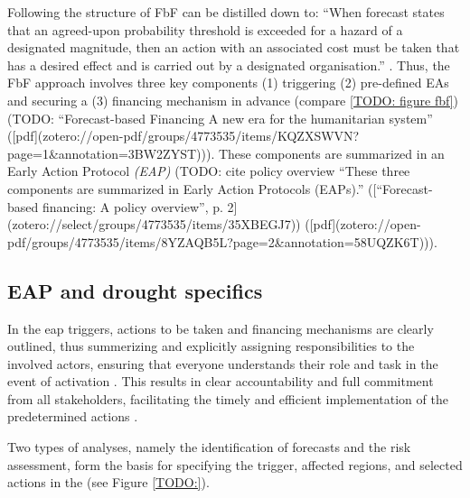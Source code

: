 {

Following \autocite{coughlandeperezForecastbasedFinancingApproach2015, coughlandeperezActionbasedFloodForecasting2016} the structure of FbF can be distilled down to:
    “When forecast states that an agreed-upon probability threshold is exceeded for a hazard of a designated magnitude, then an action with an associated cost must be taken that has a desired effect and is carried out by a designated organisation.” \autocite[2]{coughlandeperezActionbasedFloodForecasting2016}.
Thus, the FbF approach involves three key components (1) triggering (2) pre-defined EAs and securing a (3) financing mechanism in advance (compare \ref{TODO: figure fbf}) (TODO: “Forecast-based Financing A new era for the humanitarian system” ([pdf](zotero://open-pdf/groups/4773535/items/KQZXSWVN?page=1&annotation=3BW2ZYST))). These components are summarized in an Early Action Protocol \textit{(EAP)} (TODO: cite policy overview “These three components are summarized in Early Action Protocols (EAPs).” ([“Forecast-based financing: A policy overview”, p. 2](zotero://select/groups/4773535/items/35XBEGJ7)) ([pdf](zotero://open-pdf/groups/4773535/items/8YZAQB5L?page=2&annotation=58UQZK6T))). 



\subsection{EAP and drought specifics}

In the \acrfull*{eap} triggers, actions to be taken and financing mechanisms are clearly outlined, thus summerizing and explicitly assigning responsibilities to the involved actors, ensuring that everyone understands their role and task in the event of activation \autocite{ruthForecastbasedFinancingPolicy2017}. This results in clear accountability and full commitment from all stakeholders, facilitating the timely and efficient implementation of the predetermined actions \autocite{ruthForecastbasedFinancingPolicy2017}.

Two types of analyses, namely the identification of forecasts and the risk assessment, form the basis for specifying the trigger, affected regions, and selected actions in the  (see Figure \ref*{TODO:}). 


}
